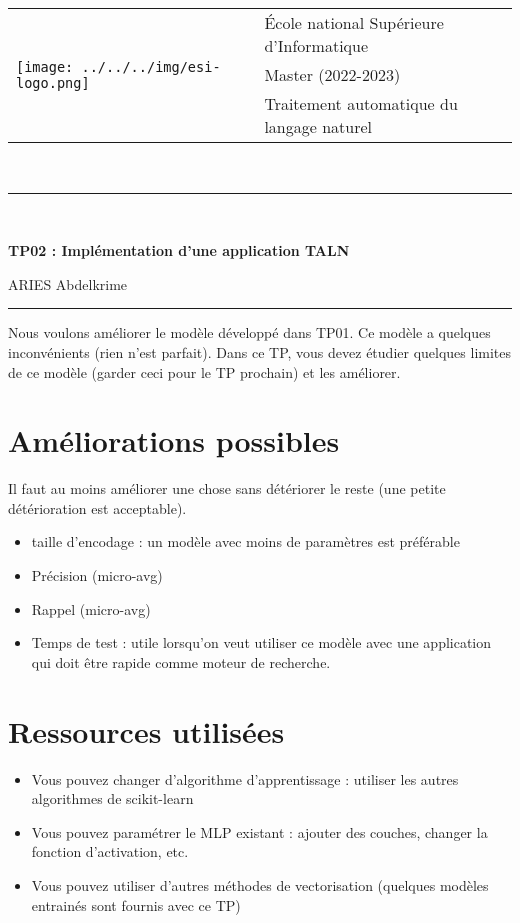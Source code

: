 \documentclass[11pt, a4paper]{article}
\begin{document}

\noindent
\begin{tabular}{ll}
\multirow{3}{*}{\texttt{[image: ../../../img/esi-logo.png]}} & \'Ecole national Supérieure d'Informatique\\
& Master (2022-2023) \\
& Traitement automatique du langage naturel
\end{tabular}\\[.25cm]
\noindent\rule{\textwidth}{1pt}\\%
\begin{center}
{\LARGE \textbf{TP02 : Implémentation d'une application TALN}}
\begin{flushright}
	ARIES Abdelkrime
\end{flushright}
\end{center}
\noindent\rule{\textwidth}{1pt}

Nous voulons améliorer le modèle développé dans TP01.
Ce modèle a quelques inconvénients (rien n'est parfait).
Dans ce TP, vous devez étudier quelques limites de ce modèle (garder ceci pour le TP prochain) et les améliorer.


\section{Améliorations possibles}
Il faut au moins améliorer une chose sans détériorer le reste (une petite détérioration est acceptable).

\begin{itemize}
	\item taille d'encodage : un modèle avec moins de paramètres est préférable
	\item Précision (micro-avg)
	\item Rappel (micro-avg)
	\item Temps de test : utile lorsqu'on veut utiliser ce modèle avec une application qui doit être rapide comme moteur de recherche.
\end{itemize}

\section{Ressources utilisées}

\begin{itemize}
	\item Vous pouvez changer d'algorithme d'apprentissage : utiliser les autres algorithmes de scikit-learn
	\item Vous pouvez paramétrer le MLP existant : ajouter des couches, changer la fonction d'activation, etc.
	\item Vous pouvez utiliser d'autres méthodes de vectorisation (quelques modèles entrainés sont fournis avec ce TP)
\end{itemize}
\end{document}
